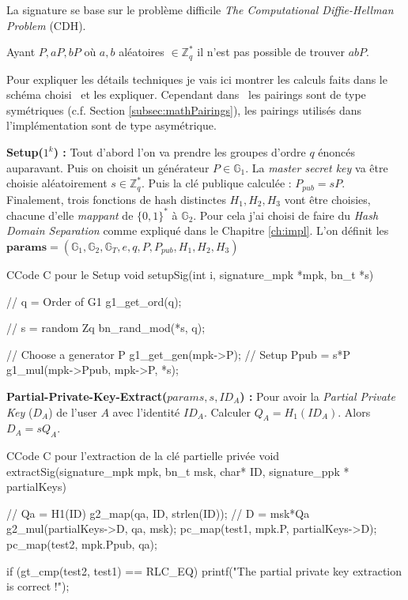 La signature se base sur le problème difficile \textit{The Computational Diffie-Hellman Problem} (CDH). 

Ayant $P, aP, bP$ où $a,b$ aléatoires $\in \mathbb{Z}_q^*$ il n'est pas possible de trouver $abP$.

Pour expliquer les détails techniques je vais ici montrer les calculs faits dans le schéma choisi~\cite{DBLP:conf/acns/ZhangWXF06} et les expliquer. Cependant dans~\cite{DBLP:conf/acns/ZhangWXF06} les pairings sont de type symétriques (c.f. Section \ref{subsec:mathPairings}), les pairings utilisés dans l'implémentation sont de type asymétrique.

\textbf{Setup($1^k $) :} Tout d'abord l'on va prendre les groupes d'ordre $q$ énoncés auparavant. Puis on choisit un générateur $P \in \mathbb{G}_1$. La \textit{master secret key} va être choisie aléatoirement $s \in \mathbb{Z}_q^*$. Puis la clé publique calculée : $P_{pub} = sP$. Finalement, trois fonctions de hash distinctes $H_1, H_2, H_3$ vont être choisies, chacune d'elle \textit{mappant} de $\{0,1\}^*$ à $\mathbb{G}_2$. Pour cela j'ai choisi de faire du \textit{Hash Domain Separation} comme expliqué dans le Chapitre \ref{ch:impl}. L'on définit les $\mathbf{params} = (\mathbb{G}_1,\mathbb{G}_2,\mathbb{G}_T,e,q,P,P_{pub},H_1,H_2,H_3)$

\begin{sourcebox}{C}{Code C pour le Setup}
	void setupSig(int i, signature_mpk *mpk, bn_t *s){
		// q = Order of G1
		g1_get_ord(q);
		
		// s = random Zq
		bn_rand_mod(*s, q);
		
		// Choose a generator P
		g1_get_gen(mpk->P);
		// Setup Ppub = s*P
		g1_mul(mpk->Ppub, mpk->P, *s);
	}
\end{sourcebox}

\textbf{Partial-Private-Key-Extract($params, s, ID_A$) :} Pour avoir la \textit{Partial Private Key} ($D_A$) de l'user $A$ avec l'identité $ID_A$. Calculer $Q_A = H_1(ID_A)$. Alors $D_A = sQ_A$.

\begin{sourcebox}{C}{Code C pour l'extraction de la clé partielle privée}
	void extractSig(signature_mpk mpk, bn_t msk, char* ID, signature_ppk * partialKeys) {
		// Qa = H1(ID)
		g2_map(qa, ID, strlen(ID));
		// D = msk*Qa
		g2_mul(partialKeys->D, qa, msk);
		pc_map(test1, mpk.P, partialKeys->D);
		pc_map(test2, mpk.Ppub, qa);
		
		if (gt_cmp(test2, test1) == RLC_EQ) {
			printf("The partial private key extraction is correct !\n");
		}
	}
\end{sourcebox}

